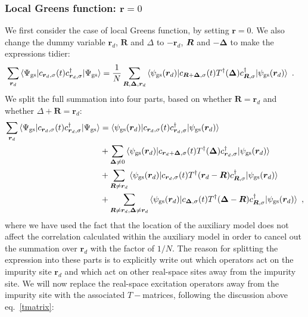 \subsubsection*{Local Greens function: \(\bm r = 0\)}
We first consider the case of local Greens function, by setting \(\bm r=0\). We also change the dummy variable \(\bm r_d\), \(\bm R\) and \(\Delta\) to \(-\bm r_d\), \(\-\bm R\) and \(-\bm \Delta\) to make the expressions tidier:
\begin{equation}\begin{aligned}
	\sum_{\bm r_d}\braket{\Psi_\text{gs} | c_{{\bm r_d},\sigma}(t) c^\dagger_{{\bm r_d},\sigma} | \Psi_\text{gs}} &=\frac{1}{N}\sum_{\bm R,\bm \Delta,\bm r_d} \braket{\psi_\text{gs}({\bm r_d}) |  c_{{\bm R + \bm \Delta},\sigma}(t) T^\dagger({\bm \Delta}) c^\dagger_{{\bm R},\sigma} | \psi_\text{gs}({\bm r_d})}~.
\end{aligned}\end{equation}
We split the full summation into four parts, based on whether \(\bm R = \bm r_d\) and whether \(\Delta + \bm R = \bm r_d\):
\begin{equation}\begin{aligned}\label{realGreenSplit}
	\sum_{\bm r_d}\braket{\Psi_\text{gs} | c_{{\bm r_d},\sigma}(t) c^\dagger_{{\bm r_d},\sigma} | \Psi_\text{gs}} &= \braket{\psi_\text{gs}({\bm r_d}) |  c_{{\bm r_d},\sigma}(t) c^\dagger_{{\bm r_d},\sigma} | \psi_\text{gs}({\bm r_d})}\\
																												  &+ \sum_{\bm \Delta \neq 0}\braket{\psi_\text{gs}({\bm r_d}) |  c_{{\bm r_d + \bm \Delta},\sigma}(t) T^\dagger({\bm \Delta}) c^\dagger_{{\bm r_d},\sigma} | \psi_\text{gs}({\bm r_d})}\\
																											&+\sum_{\bm R \neq \bm r_d}\braket{\psi_\text{gs}({\bm r_d}) |  c_{{\bm r_d},\sigma}(t) T^\dagger({\bm r_d - \bm R}) c^\dagger_{{\bm R},\sigma} | \psi_\text{gs}({\bm r_d})}\\
																											&+\sum_{\bm R \neq \bm r_d, \bm \Delta \neq \bm r_d}\braket{\psi_\text{gs}({\bm r_d}) |  c_{{\bm \Delta},\sigma}(t) T^\dagger({\bm \Delta - \bm R}) c^\dagger_{{\bm R},\sigma} | \psi_\text{gs}({\bm r_d})}~,
\end{aligned}\end{equation}
where we have used the fact that the location of the auxiliary model does not affect the correlation calculated within the auxiliary model in order to cancel out the summation over \(\bm r_d\) with the factor of \(1/N\). The reason for splitting the expression into these parts is to explicitly write out which operators act on the impurity site \(\bm r_d\) and which act on other real-space sites away from the impurity site. We will now replace the real-space excitation operators away from the impurity site with the associated \(T-\)matrices, following the discussion above eq.~\ref{tmatrix}:

